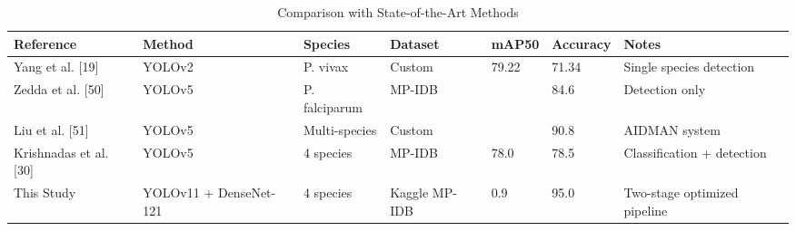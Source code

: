 \begin{table}[h]
\centering
\caption{Comparison with State-of-the-Art Methods}
\label{tab:prior_works_comparison}
\begin{tabular}{lllllll}
\toprule
Reference & Method & Species & Dataset & mAP50 & Accuracy & Notes \\
\midrule
Yang et al. [19] & YOLOv2 & P. vivax & Custom & 79.22 & 71.34 & Single species detection \\
Zedda et al. [50] & YOLOv5 & P. falciparum & MP-IDB &  & 84.6 & Detection only \\
Liu et al. [51] & YOLOv5 & Multi-species & Custom &  & 90.8 & AIDMAN system \\
Krishnadas et al. [30] & YOLOv5 & 4 species & MP-IDB & 78.0 & 78.5 & Classification + detection \\
This Study & YOLOv11 + DenseNet-121 & 4 species & Kaggle MP-IDB & 0.9 & 95.0 & Two-stage optimized pipeline \\
\bottomrule
\end{tabular}

\end{table}
